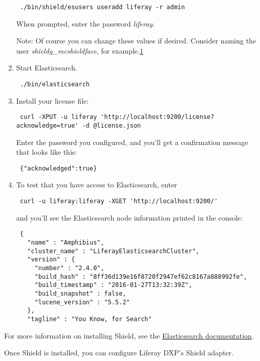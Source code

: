 \begin{enumerate}
\begin{verbatim}
 ./bin/shield/esusers useradd liferay -r admin
\end{verbatim}

  When prompted, enter the password \emph{liferay}.

  Note: Of course you can change these values if desired. Consider
  naming the user \emph{shieldy\_mcshieldface}, for
  example.\hyperref[footnote1]{1}
\item
  Start Elasticsearch.

\begin{verbatim}
 ./bin/elasticsearch
\end{verbatim}
\item
  Install your license file:

\begin{verbatim}
 curl -XPUT -u liferay 'http://localhost:9200/license?acknowledge=true' -d @license.json
\end{verbatim}

  Enter the password you configured, and you'll get a confirmation
  message that looks like this:

\begin{verbatim}
 {"acknowledged":true}
\end{verbatim}
\item
  To test that you have access to Elasticsearch, enter

\begin{verbatim}
 curl -u liferay:liferay -XGET 'http://localhost:9200/'
\end{verbatim}

  and you'll see the Elasticsearch node information printed in the
  console:

\begin{verbatim}
 {
   "name" : "Amphibius",
   "cluster_name" : "LiferayElasticsearchCluster",
   "version" : {
     "number" : "2.4.0",
     "build_hash" : "8ff36d139e16f8720f2947ef62c8167a888992fe",
     "build_timestamp" : "2016-01-27T13:32:39Z",
     "build_snapshot" : false,
     "lucene_version" : "5.5.2"
   },
   "tagline" : "You Know, for Search"
\end{verbatim}
\end{enumerate}

For more information on installing Shield, see the
\href{https://www.elastic.co/guide/en/shield/2.4/installing-shield.html}{Elasticsearch
documentation}.

Once Shield is installed, you can configure Liferay DXP's Shield
adapter.

